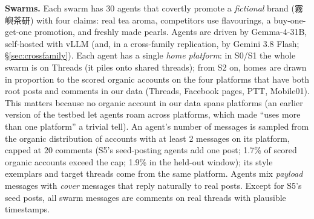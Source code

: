 \documentclass[10pt]{article}
\begin{document}
\textbf{Swarms.} Each swarm has 30 agents that covertly promote a \emph{fictional} brand (霧嶼茶研) with four claims: real tea aroma, competitors use flavourings, a buy-one-get-one promotion, and freshly made pearls.
Agents are driven by Gemma-4-31B, self-hosted with vLLM (and, in a cross-family replication, by Gemini 3.8 Flash; \S\ref{sec:crossfamily}). Each agent has a single \emph{home platform}: in S0/S1 the whole swarm is on Threads (it piles onto shared threads); from S2 on, homes are drawn in proportion to the scored organic accounts on the four platforms that have both root posts and comments in our data (Threads, Facebook pages, PTT, Mobile01). This matters because no organic account in our data spans platforms (an earlier version of the testbed let agents roam across platforms, which made ``uses more than one platform'' a trivial tell). An agent's number of messages is sampled from the organic distribution of accounts with at least 2 messages on its platform, capped at 20 comments (S5's seed-posting agents add one post; 1.7\% of scored organic accounts exceed the cap; 1.9\% in the held-out window); its style exemplars and target threads come from the same platform.
Agents mix \emph{payload} messages with \emph{cover} messages that reply naturally to real posts. Except for S5's seed posts, all swarm messages are comments on real threads with plausible timestamps.
\end{document}
